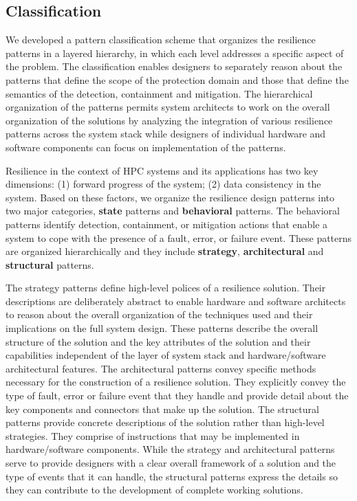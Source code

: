 \subsection{Classification}
We developed a pattern classification scheme that organizes the resilience patterns in a layered hierarchy, in which each level addresses a specific aspect of the problem. The classification enables designers to separately reason about the patterns that define the scope of the protection domain and those that define the semantics of the detection, containment and mitigation. The hierarchical organization of the patterns permits system architects to work on the overall organization of the solutions by analyzing the integration of various resilience patterns across the system stack while designers of individual hardware and software components can focus on implementation of the patterns.  

Resilience in the context of HPC systems and its applications has two key dimensions: (1) forward progress of the system; (2) data consistency in the system. Based on these factors, we organize the resilience design patterns into two major categories, \textbf{state} patterns and \textbf{behavioral} patterns.
The behavioral patterns identify detection, containment, or mitigation actions that enable a system to cope with the presence of a fault, error, or failure event. These patterns are organized hierarchically and they include \textbf{strategy}, \textbf{architectural} and \textbf{structural} patterns. 

The strategy patterns define high-level polices of a resilience solution. Their descriptions are deliberately abstract to enable hardware and software architects to reason about the overall organization of the techniques used and their implications on the full system design. These patterns describe the overall structure of the solution and the key attributes of the solution and their capabilities independent of the layer of system stack and hardware/software architectural features. The architectural patterns convey specific methods necessary for the construction of a resilience solution. They explicitly convey the type of fault, error or failure event that they handle and provide detail about the key components and connectors that make up the solution. The structural patterns provide concrete descriptions of the solution rather than high-level strategies. They comprise of instructions that may be implemented in hardware/software components. While the strategy and architectural patterns serve to provide designers with a clear overall framework of a solution and the type of events that it can handle, the structural patterns express the details so they can contribute to the development of complete working solutions.

